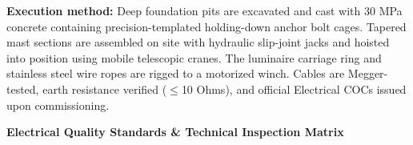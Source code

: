 \noindent
\begin{minipage}[t]{0.185\textwidth}\end{minipage}\hfill
\begin{minipage}[t]{0.185\textwidth}\end{minipage}\hfill
\begin{minipage}[t]{0.185\textwidth}\end{minipage}\hfill
\begin{minipage}[t]{0.185\textwidth}\end{minipage}\hfill
\begin{minipage}[t]{0.185\textwidth}\end{minipage}

\vspace{0.20cm}

\noindent
\begin{tcolorbox}[enhanced, colback=mhoffwhite, colframe=mhlightgray, boxrule=0.7pt, arc=4pt, left=9pt, right=9pt, top=7pt, bottom=7pt, borderline west={3pt}{0pt}{mhgold}, drop shadow=black!4]
    {\fontsize{8.1pt}{11.0pt}\selectfont\color{mhtext}
    \textbf{Execution method:} Deep foundation pits are excavated and cast with 30 MPa concrete containing precision-templated holding-down anchor bolt cages. Tapered mast sections are assembled on site with hydraulic slip-joint jacks and hoisted into position using mobile telescopic cranes. The luminaire carriage ring and stainless steel wire ropes are rigged to a motorized winch. Cables are Megger-tested, earth resistance verified ($\le$10 Ohms), and official Electrical COCs issued upon commissioning.
    }
\end{tcolorbox}

\vfill

\noindent
{\large\bfseries\color{mhnavy} Electrical Quality Standards \& Technical Inspection Matrix}
\vspace{0.10cm}

